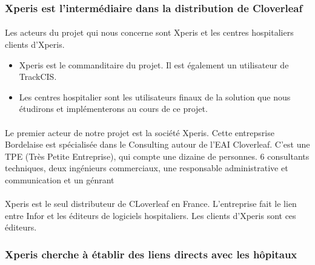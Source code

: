 		\subsubsection{Xperis est l'intermédiaire dans la distribution de Cloverleaf}
			\paragraph{}%
			Les acteurs du projet qui nous concerne sont Xperis et les centres
			hospitaliers clients d'Xperis.
			\begin{itemize}
			  \item Xperis est le commanditaire du projet. Il est également un
			  utilisateur de TrackCIS.
			  \item Les centres hospitalier sont les utilisateurs finaux de la solution
			  que nous étudirons et implémenterons au cours de ce projet.
			\end{itemize}
			
			\paragraph{}%
			Le premier acteur de notre projet est la société Xperis. Cette entrepsrise
			Bordelaise est spécialisée dans le Consulting autour de l'EAI Cloverleaf.
			C'est une TPE (Très Petite Entreprise), qui compte une dizaine de personnes.
			6 consultants techniques, deux ingénieurs commerciaux, une responsable
			administrative et communication et un génrant
			
			\paragraph{}%
			Xperis est le seul distributeur de CLoverleaf en France. L'entreprise fait le
			lien entre Infor et les éditeurs de logiciels hospitaliers. Les clients
			d'Xperis sont ces éditeurs.
			
		\subsubsection{Xperis cherche à établir des liens directs avec les hôpitaux}
